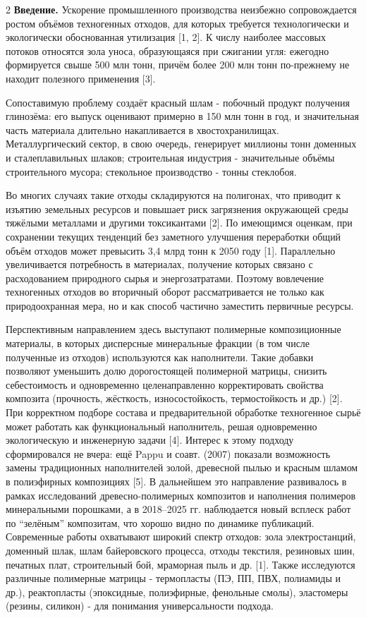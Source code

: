 \begin{multicols}{2}
{\bfseries Введение.} Ускорение промышленного производства неизбежно
сопровождается ростом объёмов техногенных отходов, для которых требуется
технологически и экологически обоснованная утилизация {[}1, 2{]}. К
числу наиболее массовых потоков относятся зола уноса, образующаяся при
сжигании угля: ежегодно формируется свыше 500 млн тонн, причём более 200
млн тонн по-прежнему не находит полезного применения {[}3{]}.

Сопоставимую проблему создаёт красный шлам - побочный продукт получения
глинозёма: его выпуск оценивают примерно в 150 млн тонн в год, и
значительная часть материала длительно накапливается в хвостохранилищах.
Металлургический сектор, в свою очередь, генерирует миллионы тонн
доменных и сталеплавильных шлаков; строительная индустрия - значительные
объёмы строительного мусора; стекольное производство - тонны стеклобоя.

Во многих случаях такие отходы складируются на полигонах, что приводит к
изъятию земельных ресурсов и повышает риск загрязнения окружающей среды
тяжёлыми металлами и другими токсикантами {[}2{]}. По имеющимся оценкам,
при сохранении текущих тенденций без заметного улучшения переработки
общий объём отходов может превысить 3,4 млрд тонн к 2050 году {[}1{]}.
Параллельно увеличивается потребность в материалах, получение которых
связано с расходованием природного сырья и энергозатратами. Поэтому
вовлечение техногенных отходов во вторичный оборот рассматривается не
только как природоохранная мера, но и как способ частично заместить
первичные ресурсы.

Перспективным направлением здесь выступают полимерные композиционные
материалы, в которых дисперсные минеральные фракции (в том числе
полученные из отходов) используются как наполнители. Такие добавки
позволяют уменьшить долю дорогостоящей полимерной матрицы, снизить
себестоимость и одновременно целенаправленно корректировать свойства
композита (прочность, жёсткость, износостойкость, термостойкость и др.)
{[}2{]}. При корректном подборе состава и предварительной обработке
техногенное сырьё может работать как функциональный наполнитель, решая
одновременно экологическую и инженерную задачи {[}4{]}. Интерес к этому
подходу сформировался не вчера: ещё Pappu и соавт. (2007) показали
возможность замены традиционных наполнителей золой, древесной пылью и
красным шламом в полиэфирных композициях {[}5{]}. В дальнейшем это
направление развивалось в рамках исследований древесно-полимерных
композитов и наполнения полимеров минеральными порошками, а в 2018--2025
гг. наблюдается новый всплеск работ по ``зелёным'' композитам, что
хорошо видно по динамике публикаций. Современные работы охватывают
широкий спектр отходов: зола электростанций, доменный шлак, шлам
байеровского процесса, отходы текстиля, резиновых шин, печатных плат,
строительный бой, мраморная пыль и др. {[}1{]}. Также исследуются
различные полимерные матрицы - термопласты (ПЭ, ПП, ПВХ, полиамиды и
др.), реактопласты (эпоксидные, полиэфирные, фенольные смолы),
эластомеры (резины, силикон) - для понимания универсальности подхода.


\end{multicols}
